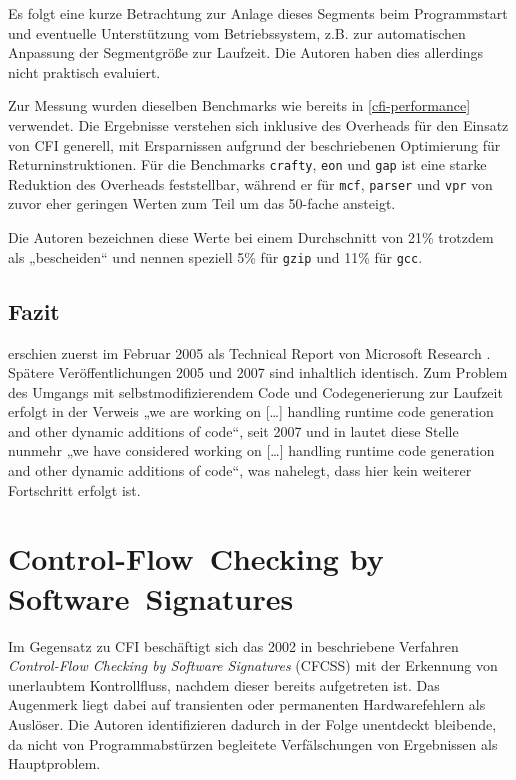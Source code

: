 \documentclass[11pt]{article}
\begin{document}
Es folgt eine kurze Betrachtung zur Anlage dieses Segments beim Programmstart
und eventuelle Unterstützung vom Betriebssystem, z.B. zur automatischen
Anpassung der Segmentgröße zur Laufzeit. Die Autoren haben dies allerdings
nicht praktisch evaluiert.

Zur Messung wurden dieselben Benchmarks wie bereits in \ref{cfi-performance}
verwendet. Die Ergebnisse verstehen sich inklusive des Overheads für den
Einsatz von CFI generell, mit Ersparnissen aufgrund der beschriebenen
Optimierung für Returninstruktionen. Für die Benchmarks \texttt{crafty},
\texttt{eon} und \texttt{gap} ist eine starke Reduktion des Overheads
feststellbar, während er für \texttt{mcf}, \texttt{parser} und \texttt{vpr} von
zuvor eher geringen Werten zum Teil um das 50-fache ansteigt.

Die Autoren bezeichnen diese Werte bei einem Durchschnitt von 21\% trotzdem als
„bescheiden“ und nennen speziell 5\% für \texttt{gzip} und 11\% für
\texttt{gcc}.

\subsection{Fazit}

\cite{abadi-2009-control-tissec} erschien zuerst im Februar 2005 als Technical
Report von Microsoft Research \cite{abadi-2005-control-msr}. Spätere
Veröffentlichungen 2005 und 2007 sind inhaltlich identisch. Zum Problem des
Umgangs mit selbstmodifizierendem Code und Codegenerierung zur Laufzeit erfolgt
in \cite{abadi-2005-control-msr} der Verweis „we are working on […] handling
runtime code generation and other dynamic additions of code“, seit 2007 und in
\cite{abadi-2009-control-tissec} lautet diese Stelle nunmehr „we have
considered working on […] handling runtime code generation and other dynamic
additions of code“, was nahelegt, dass hier kein weiterer Fortschritt erfolgt
ist. %

\section{Control-Flow~Checking by Software~Signatures}


Im Gegensatz zu CFI beschäftigt sich das 2002 in \cite{oh-2002-control}
beschriebene Verfahren \emph{Control-Flow Checking by Software Signatures}
(CFCSS) mit der Erkennung von unerlaubtem Kontrollfluss, nachdem dieser bereits
aufgetreten ist. Das Augenmerk liegt dabei auf transienten oder permanenten
Hardwarefehlern als Auslöser. Die Autoren identifizieren dadurch in der Folge
unentdeckt bleibende, da nicht von Programmabstürzen begleitete Verfälschungen
von Ergebnissen als Hauptproblem.
\end{document}

